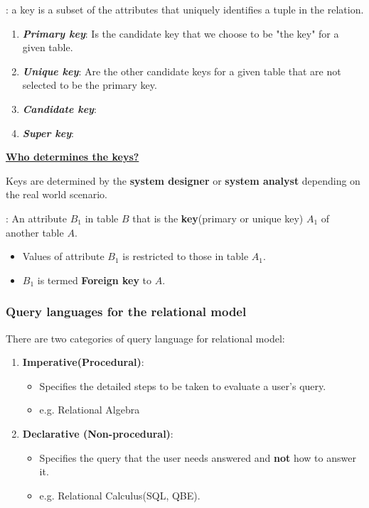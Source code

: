 \documentclass{ainote}
\begin{document}
:
a key is a subset of the attributes that uniquely identifies a tuple in the relation.
\begin{enumerate}
    \item \textbf{\textit{Primary key}}: Is the candidate key that we choose to be "the key" for a given table.
    \item \textbf{\textit{Unique key}}: Are the other candidate keys for a given table that are not selected to be the primary key.
    \item \textbf{\textit{Candidate key}}: 
    \item \textbf{\textit{Super key}}: 
\end{enumerate}
\begin{note}
    \underline{\textbf{Who determines the keys?}}
    
    Keys are determined by the \textbf{system designer} or \textbf{system analyst} depending on the real world scenario.
\end{note}

: An attribute $B_1$ in table $B$ that is the \textbf{key}(primary or unique key) $A_1$ of another table $A$.
\begin{itemize}
    \item Values of attribute $B_1$ is restricted to those in table $A_1$.
    \item $B_1$ is termed \textbf{Foreign key} to $A$.
\end{itemize}

\subsubsection{Query languages for the relational model}
There are two categories of query language for relational model:
\begin{enumerate}
    \item \textbf{Imperative(Procedural)}: 
        \begin{itemize}
            \item Specifies the detailed steps to be taken to evaluate a user's query.
            \item e.g. Relational Algebra
        \end{itemize}
    \item \textbf{Declarative (Non-procedural)}:
        \begin{itemize}
            \item Specifies the query that the user needs answered and \textbf{not} how to answer it.
            \item e.g. Relational Calculus(SQL, QBE).
        \end{itemize}
\end{enumerate}
\end{document}
